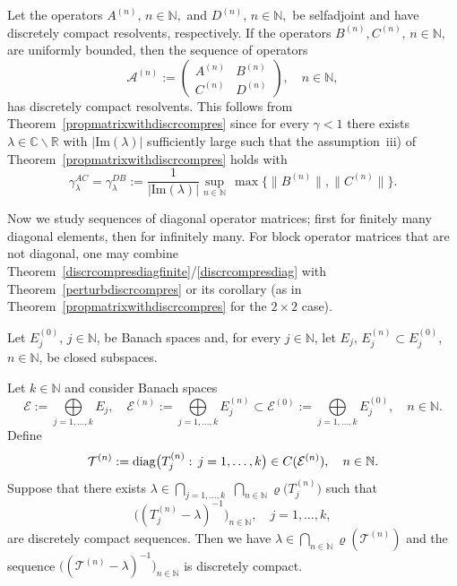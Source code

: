 \documentclass[a4paper,reqno]{amsart}
\begin{document}
\begin{example}
Let the operators $A^{(n)}, \,n\in{\mathbb{N}},$  and  $D^{(n)}, \,n\in{\mathbb{N}},$ be selfadjoint and have discretely compact resolvents, respectively.
If the operators $B^{(n)}, C^{(n)},\,n\in{\mathbb{N}},$ are uniformly bounded, then the sequence of operators $${\mathcal A}^{(n)}:=\begin{pmatrix} A^{(n)} &B^{(n)}\\ C^{(n)} &D^{(n)}\end{pmatrix}, \quad n\in{\mathbb{N}},$$ has discretely compact resolvents.
This follows from Theorem~\ref{propmatrixwithdiscrcompres} since for every $\gamma<1$ there exists 
$\lambda\in{\mathbb{C}}\backslash{\mathbb{R}}$  with $|{\mathrm{Im}}(\lambda)|$ sufficiently large such that the assumption~iii) of Theorem~\ref{propmatrixwithdiscrcompres} holds with 
$$\gamma_\lambda^{AC}=\gamma_\lambda^{DB}:=\frac{1}{|{\mathrm{Im}}(\lambda)|}\sup_{n\in{\mathbb{N}}}\,\max\big\{\|B^{(n)}\|,\|C^{(n)}\|\big\}.$$
\end{example}

Now we  study sequences of diagonal operator matrices; first for finitely many diagonal elements, then for infinitely many.
For block operator matrices that are not diagonal, one may combine Theorem~\ref{discrcompresdiagfinite}/\ref{discrcompresdiag} 
with Theorem~\ref{perturbdiscrcompres} or its corollary (as in Theorem~\ref{propmatrixwithdiscrcompres} for the $2\times 2$ case).

Let $E_j^{(0)}$, $j\in{\mathbb{N}}$, be Banach spaces and, for every $j\in{\mathbb{N}}$, let  $E_j,\,E_j^{(n)}\subset E_j^{(0)}$, $n\in{\mathbb{N}}$, be closed subspaces.

\begin{theorem}
 Let $k\in{\mathbb{N}}$ and consider Banach spaces $${\mathcal E}:=\underset{j=1,\dots,k}{\bigoplus}E_j, \quad {\mathcal E}^{(n)}:=\underset{j=1,\dots,k}{\bigoplus}E_j^{(n)}\subset {\mathcal E}^{(0)}:=\underset{j=1,\dots,k}{\bigoplus}E_j^{(0)}, \quad n\in{\mathbb{N}}.$$ 
Define
$${\mathcal T}^{(n)}:={{\rm diag} }\big(T_j^{(n)}:\,j=1,\dots, k\big)\in C({\mathcal E}^{(n)}), \quad n\in{\mathbb{N}}. $$
Suppose that there exists $\lambda\in\underset{j=1,\dots,k}{\bigcap}\,\,\underset{n\in{\mathbb{N}}}{\bigcap}\varrho\big(T_j^{(n)}\big)$ such that 
$$\big((T_j^{(n)}-\lambda)^{-1}\big)_{n\in{\mathbb{N}}}, \quad j=1,\dots,k,$$ are discretely compact sequences.
Then we have $\lambda\in\underset{n\in{\mathbb{N}}}{\bigcap}\varrho({\mathcal T}^{(n)})$ and the sequence $\big(({\mathcal T}^{(n)}-\lambda)^{-1}\big)_{n\in{\mathbb{N}}}$
is discretely compact.
\label{discrcompresdiagfinite}
\end{theorem}
\end{document}
